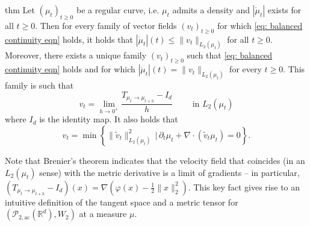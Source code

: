 \documentclass[11pt]{article}
\begin{document}
\begin{restatable}{thm}{}
    Let $(\mu_t)_{t\geq 0}$ be a regular curve, i.e. $\mu_t$ admits a density and $|\dot \mu_t|$ exists for all $t \geq 0$. Then for every family of vector fields $(v_t)_{t\geq 0}$ for which \cref{eq: balanced continuity eqn} holds, it holds that $|\dot \mu_t|(t) \leq \|v_t\|_{L_2(\mu_t)}$ for all $t \geq 0$. Moreover, there exists a unique family $(v_t)_{t\geq 0}$ such that \cref{eq: balanced continuity eqn} holds and for which $|\dot \mu_t|(t) = \|v_t\|_{L_2(\mu_t)}$ for every $t \geq 0$. This family is such that
    \begin{equation*}
        v_t = \lim_{h \rightarrow0^+}\frac{T_{\mu_t\rightarrow \mu_{t+h}}- I_d}{h} \qquad \text{ in $L_2(\mu_t)$}
    \end{equation*}
    where $I_d$ is the identity map. It also holds that 
    \begin{equation*}
        v_t = \min \left\{\|\tilde{v}_t\|_{L_2(\mu_t)}^2 \, \Big|\, \partial_t\mu_t + \nabla \cdot (\tilde v_t\mu_t) = 0\right\}.
    \end{equation*}
\end{restatable}

Note that Brenier's theorem indicates that the velocity field that coincides (in an $L_2(\mu_t)$ sense) with the metric derivative is a limit of gradients -- in particular, $(T_{\mu_t \rightarrow \mu_{t+h}} - I_d)(x) = \nabla (\varphi(x) - \frac{1}{2}\|x\|_2^2)$. This key fact gives rise to an intuitive definition of the tangent space and a metric tensor for $(\mathcal{P}_{2, \text{ac}}(\mathbb{R}^d), W_2)$ at a measure $\mu$. 
\end{document}
